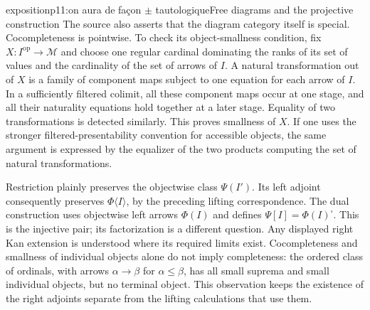 \begin{dcomment}{exposition}{p11:on aura de façon $\pm$ tautologique}{Free diagrams and the projective construction}
The source also asserts that the diagram category itself is special. Cocompleteness is pointwise. To check its object-smallness condition, fix $X:I^{\mathrm{op}}\to\mathcal M$ and choose one regular cardinal dominating the ranks of its set of values and the cardinality of the set of arrows of $I$. A natural transformation out of $X$ is a family of component maps subject to one equation for each arrow of $I$. In a sufficiently filtered colimit, all these component maps occur at one stage, and all their naturality equations hold together at a later stage. Equality of two transformations is detected similarly. This proves smallness of $X$. If one uses the stronger filtered-presentability convention for accessible objects, the same argument is expressed by the equalizer of the two products computing the set of natural transformations.

Restriction plainly preserves the objectwise class $\Psi(I')$. Its left adjoint consequently preserves $\Phi\langle I\rangle$, by the preceding lifting correspondence. The dual construction uses objectwise left arrows $\Phi(I)$ and defines $\Psi[I]=\Phi(I)^{\square}$. This is the injective pair; its factorization is a different question. Any displayed right Kan extension is understood where its required limits exist. Cocompleteness and smallness of individual objects alone do not imply completeness: the ordered class of ordinals, with arrows $\alpha\to\beta$ for $\alpha\leq\beta$, has all small suprema and small individual objects, but no terminal object. This observation keeps the existence of the right adjoints separate from the lifting calculations that use them.
\end{dcomment}

